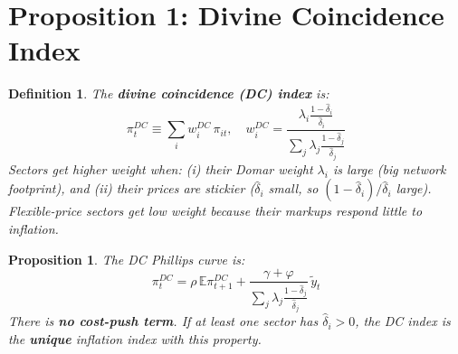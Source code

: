 \documentclass[12pt]{article}
\newtheorem{proposition}{Proposition}
\newtheorem{definition}{Definition}
\begin{document}
\section{Proposition 1: Divine Coincidence Index}

\begin{definition}
The \textbf{divine coincidence (DC) index} is:
\begin{equation}
    \pi_t^{DC} \equiv \sum_i w_i^{DC}\, \pi_{it}, \quad w_i^{DC} = \frac{\lambda_i \frac{1-\hat{\delta}_i}{\hat{\delta}_i}}{\sum_j \lambda_j \frac{1-\hat{\delta}_j}{\hat{\delta}_j}}
\end{equation}
Sectors get higher weight when: (i) their Domar weight $\lambda_i$ is large (big network footprint), and (ii) their prices are stickier ($\hat{\delta}_i$ small, so $(1-\hat{\delta}_i)/\hat{\delta}_i$ large). Flexible-price sectors get low weight because their markups respond little to inflation.
\end{definition}

\begin{proposition}
The DC Phillips curve is:
\begin{equation}
    \pi_t^{DC} = \rho\,\mathbb{E}\pi_{t+1}^{DC} + \frac{\gamma+\varphi}{\sum_j \lambda_j \frac{1-\hat{\delta}_j}{\hat{\delta}_j}}\,\tilde{y}_t
    \label{eq:DCPC}
\end{equation}
There is \textbf{no cost-push term}. If at least one sector has $\hat{\delta}_i > 0$, the DC index is the \textbf{unique} inflation index with this property.
\end{proposition}
\end{document}
